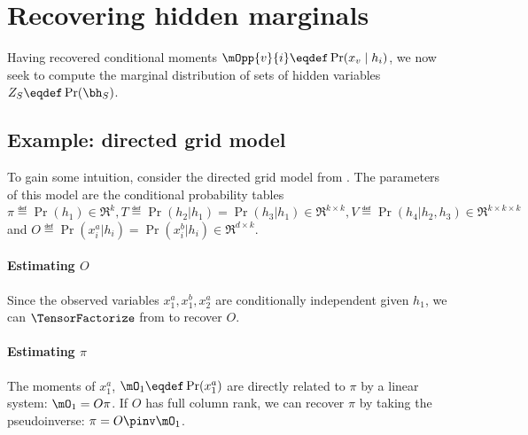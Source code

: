 \section{Recovering hidden marginals}
\label{sec:exclusiveViews}

Having recovered conditional moments $\mOpp{v}{i} \eqdef \Pr(x_v \mid h_i)$,
we now seek to compute the marginal distribution of sets of hidden variables
$Z_S \eqdef \Pr(\bh_S)$.

\subsection{Example: directed grid model}
\label{sec:directedExample}

To gain some intuition, consider the directed grid model from .
The parameters of this model are the conditional probability tables
$\pi \eqdef \Pr(h_1) \in \Re^k, T \eqdef \Pr(h_2 | h_1) = \Pr(h_3 | h_1) \in \Re^{k \times k},
V \eqdef \Pr(h_4 | h_2, h_3) \in \Re^{k \times k \times k}$ and $O \eqdef \Pr(x^a_i | h_i)
=  \Pr(x^b_i | h_i) \in \Re^{d \times k}$. 

\paragraph{Estimating $O$}
Since the observed variables $x^a_1, x^b_1, x^a_2$ are
  conditionally independent given $h_1$, we can $\TensorFactorize$ from
   to recover $O$.

\paragraph{Estimating $\pi$}
The moments of $x^a_1$, $\mO_1 \eqdef \Pr(x^a_1)$ are directly related to
  $\pi$ by a linear system: $\mO_1 = O \pi$. 
If $O$ has full column rank, we can recover $\pi$ by taking the pseudoinverse: $\pi = O\pinv  \mO_1$.

